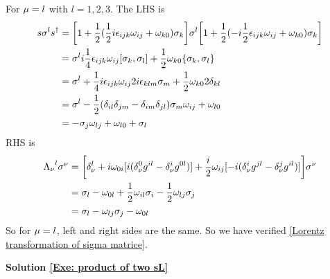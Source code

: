  For $\mu = l$ with $l=1,2,3$. The LHS is 
 \begin{align}
 s\s^{l}s^{\dagger} &= \bigg[1+\half(\half i \e_{ijk}\w_{ij}+\w_{k0})\s_k\bigg]\s^{l}\bigg[1+\half(-i\half \e_{ijk}\w_{ij}+\w_{k0})\s_k\bigg]\notag\\
 & =\s^{l} i\frac{1}{4}\e_{ijk}\w_{ij}\comm{\s_k}{\s_l}
 + \half \w_{k0}\acomm{\s_k}{\s_l}\notag\\
 & = \s^{l}
 +\frac{1}{4}i\e_{ijk}\w_{ij}2i\e_{klm}\s_m
 +\frac{1}{2}\w_{k0}2\de_{kl}\notag\\
 &=\s^{l}
 - \half(\de_{il}\de_{jm}-\de_{im}\de_{jl})\s_m\w_{ij}
 +\w_{l0}\notag\\
 &= -\s_j\w_{lj} + \w_{l0}+\s_l
 \end{align}
 RHS is
 \begin{align}
 {\Lambda_\nu}^l \sigma^\nu
 &=
 \bigg[\delta_\nu^l + 
 i\omega_{0i}[i(\delta^0_\nu g^{il}-\delta^i_\nu g^{0l})]+
 \frac{i}{2}\omega_{ij}[-i(\delta^i_\nu g^{jl}-\delta^j_\nu g^{il})]
 \bigg]\sigma^{\nu}\notag\\
 &=
 \sigma_l -\omega_{0l}+\frac{1}{2} \omega_{il}\sigma_i -\frac{1}{2}\omega_{lj}\sigma_j
 \notag\\
 &=
 \sigma_l -\omega_{lj}\sigma_j -\omega_{0l}
 \end{align}
 So for $\mu = l$, left and right sides are the same. So we have verified \eqref{Lorentz transformation of sigma matrice}.
 
 \noindent\textbf{Solution \ref{Exe: product of two sL}}
 

